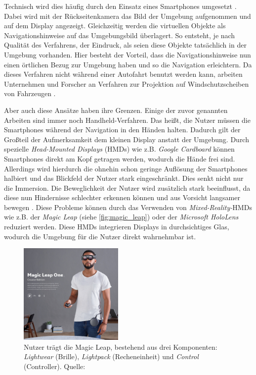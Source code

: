 \documentclass[a4paper]{scrartcl}
\begin{document}
Technisch wird dies häufig durch den Einsatz eines Smartphones umgesetzt \autocites{Morrison2009}{Mulloni2012}{Alnabhan2014}.
Dabei wird mit der Rückseitenkamera das Bild der Umgebung aufgenommen und auf dem Display angezeigt.
Gleichzeitig werden die virtuellen Objekte als Navigationshinweise auf das Umgebungsbild überlagert.
So entsteht, je nach Qualität des Verfahrens, der Eindruck, als seien diese Objekte tatsächlich in der Umgebung vorhanden.
Hier besteht der Vorteil, dass die Navigationshinweise nun einen örtlichen Bezug zur Umgebung haben und so die Navigation erleichtern.
Da dieses Verfahren nicht während einer Autofahrt benutzt werden kann, arbeiten Unternehmen und Forscher an Verfahren zur Projektion auf Windschutzscheiben von Fahrzeugen \autocites{Kim2009}{Sygic2018}{Cunningham2017}.

Aber auch diese Ansätze haben ihre Grenzen.
Einige der zuvor genannten Arbeiten sind immer noch Handheld-Verfahren.
Das heißt, die Nutzer müssen die Smartphones während der Navigation in den Händen halten.
Dadurch gilt der Großteil der Aufmerksamkeit dem kleinen Display anstatt der Umgebung.
Durch spezielle \emph{Head-Mounted Displays} (HMDs) wie z.B. \emph{Google Cardboard} \autocite{Google2018a} können Smartphones direkt am Kopf getragen werden, wodurch die Hände frei sind.
Allerdings wird hierdurch die ohnehin schon geringe Auflösung der Smartphones halbiert und das Blickfeld der Nutzer stark eingeschränkt.
Dies senkt nicht nur die Immersion.
Die Beweglichkeit der Nutzer wird zusätzlich stark beeinflusst, da diese nun Hindernisse schlechter erkennen können und aus Vorsicht langsamer bewegen \autocite[2]{Bonfert2017}.
Diese Probleme können durch das Verwenden von \emph{Mixed-Reality-}HMDs wie z.B. der \emph{Magic Leap} \autocite{MagicLeap2018} (siehe \autoref{fig:magic_leap}) oder der \emph{Microsoft HoloLens} \autocite{Microsoft2018} reduziert werden.
Diese HMDs integrieren Displays in durchsichtiges Glas, wodurch die Umgebung für die Nutzer direkt wahrnehmbar ist.

\begin{figure}[h]
	\centering
	\includegraphics[width=0.45\textwidth]{figures/magic_leap.jpg}
	\caption{%
		Nutzer trägt die Magic Leap, bestehend aus drei Komponenten: \emph{Lightwear} (Brille), \emph{Lightpack} (Recheneinheit) und \emph{Control} (Controller).
		Quelle: \autocite{MagicLeap2018}
	}
	\label{fig:magic_leap}
\end{figure}
\end{document}
